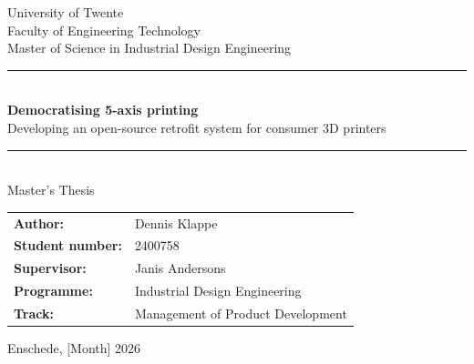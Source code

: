 \begin{titlepage}
    \centering
    \vspace*{2cm}

    {\large University of Twente}\\[0.5cm]
    {\large Faculty of Engineering Technology}\\[0.5cm]
    {\large Master of Science in Industrial Design Engineering}\\[2cm]

    \rule{\textwidth}{1pt}\\[0.5cm]
    {\Huge\bfseries Democratising 5-axis printing}\\[0.3cm]
    {\Large Developing an open-source retrofit system for consumer 3D printers}\\[0.5cm]
    \rule{\textwidth}{1pt}\\[2cm]

    {\Large Master's Thesis}\\[2cm]

    \begin{tabular}{ll}
        \textbf{Author:} & Dennis Klappe \\[0.3cm]
        \textbf{Student number:} & 2400758 \\[0.3cm]
        \textbf{Supervisor:} & Janis Andersons \\[0.3cm]
        \textbf{Programme:} & Industrial Design Engineering \\[0.3cm]
        \textbf{Track:} & Management of Product Development \\[0.3cm]
    \end{tabular}

    \vfill

    {\large Enschede, [Month] 2026}

\end{titlepage}
